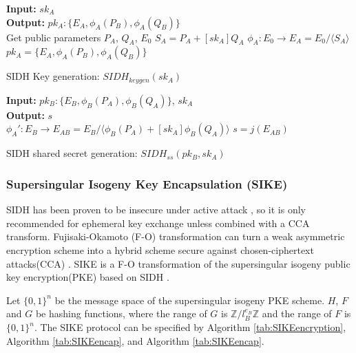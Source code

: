 \documentclass{iacrtrans}
\begin{document}
\begin{algorithm}[H]
\SetAlgoLined
\textbf{Input: } $sk_A$ \\
\textbf{Output: } $pk_A: \{E_A, \phi_A(P_B), \phi_A(Q_B)\}$ \\
Get public parameters $P_A$, $Q_A$, $E_0$\;
$S_A = P_A+[sk_A]Q_A$\;
$\phi_A: E_0 \rightarrow E_A=E_0/\langle S_A \rangle$\;
$pk_A= \{E_A, \phi_A(P_B), \phi_A(Q_B)\}$ \;
\caption{SIDH Key generation: $SIDH_{keygen}(sk_A)$}
\label{tab:sidhkeygen}
\end{algorithm}

\begin{algorithm}[H]
\SetAlgoLined
\textbf{Input: } $pk_B: \{E_B, \phi_B(P_A), \phi_B(Q_A)\}$, $sk_A$ \\
\textbf{Output: } $s$ \\
$\phi_A': E_B \rightarrow E_{AB}=E_B/\langle \phi_B(P_A) + [sk_A]\phi_B(Q_A)\rangle$\;
$s = j(E_{AB})$\;
\caption{SIDH shared secret generation: $SIDH_{ss}(pk_B, sk_A)$}
\label{tab:sidhsharedsecret}
\end{algorithm}


\subsubsection{Supersingular Isogeny Key Encapsulation (SIKE)}
SIDH has been proven to be insecure under active attack \cite{galbraith2016security}, so it is only recommended for ephemeral key exchange unless combined with a CCA transform. Fujisaki-Okamoto (F-O) transformation can turn a weak asymmetric encryption scheme into a hybrid scheme secure against chosen-ciphertext attacks(CCA) \cite{hofheinz2017modular}. SIKE is a F-O transformation of the supersingular isogeny public key encryption(PKE) based on SIDH \cite{jao2011towards}. 

Let $\{0,1\}^n$ be the message space of the supersingular isogeny PKE scheme. $H$, $F$ and $G$ be hashing functions, where the range of $G$ is $\mathbb{Z}/l_B^{e_B}\mathbb{Z}$ and the range of $F$ is $\{0,1\}^n$. The SIKE protocol can be specified by Algorithm \ref{tab:SIKEencryption}, Algorithm \ref{tab:SIKEencap}, and Algorithm \ref{tab:SIKEencap}.
\end{document}
